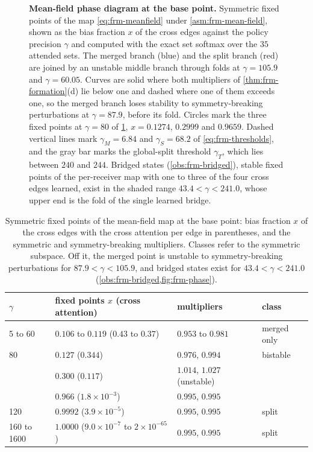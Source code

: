 \begin{figure}[t]
  \centering
  
  \caption{\textbf{Mean-field phase diagram at the base point.} Symmetric fixed points of the map \eqref{eq:frm-meanfield} under \cref{asm:frm-mean-field}, shown as the bias fraction $x$ of the cross edges against the policy precision $\gamma$ and computed with the exact set softmax over the $35$ attended sets. The merged branch (blue) and the split branch (red) are joined by an unstable middle branch through folds at $\gamma=105.9$ and $\gamma=60.05$. Curves are solid where both multipliers of \cref{thm:frm-formation}(d) lie below one and dashed where one of them exceeds one, so the merged branch loses stability to symmetry-breaking perturbations at $\gamma=87.9$, before its fold. Circles mark the three fixed points at $\gamma=80$ of \cref{tab:frm-thresholds}, $x=0.1274$, $0.2999$ and $0.9659$. Dashed vertical lines mark $\gamma_M=6.84$ and $\gamma_S=68.2$ of \eqref{eq:frm-thresholds}, and the gray bar marks the global-split threshold $\gamma_T$, which lies between $240$ and $244$. Bridged states (\cref{obs:frm-bridged}), stable fixed points of the per-receiver map with one to three of the four cross edges learned, exist in the shaded range $43.4<\gamma<241.0$, whose upper end is the fold of the single learned bridge.}
  \label{fig:frm-phase}
\end{figure}

\begin{table}[tb]
\centering
\caption{Symmetric fixed points of the mean-field map at the base point: bias fraction $x$ of the cross edges with the cross attention per edge in parentheses, and the symmetric and symmetry-breaking multipliers. Classes refer to the symmetric subspace. Off it, the merged point is unstable to symmetry-breaking perturbations for $87.9<\gamma<105.9$, and bridged states exist for $43.4<\gamma<241.0$ (\cref{obs:frm-bridged,fig:frm-phase}).}
\label{tab:frm-thresholds}
\begin{tabular}{@{}llll@{}}
\toprule
$\gamma$ & fixed points $x$ (cross attention) & multipliers & class \\
\midrule
5 to 60 & $0.106$ to $0.119$ ($0.43$ to $0.37$) & $0.953$ to $0.981$ & merged only \\
80 & $0.127$ ($0.344$) & $0.976$, $0.994$ & bistable \\
 & $0.300$ ($0.117$) & $1.014$, $1.027$ (unstable) & \\
 & $0.966$ ($1.8\times10^{-3}$) & $0.995$, $0.995$ & \\
120 & $0.9992$ ($3.9\times10^{-5}$) & $0.995$, $0.995$ & split \\
160 to 1600 & $1.0000$ ($9.0\times10^{-7}$ to $2\times10^{-65}$) & $0.995$, $0.995$ & split \\
\bottomrule
\end{tabular}
\end{table}


